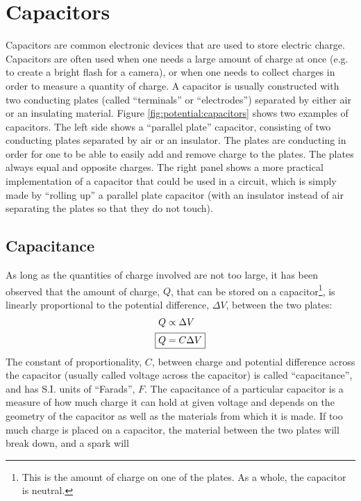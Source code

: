 \section{Capacitors}
Capacitors are common electronic devices that are used to store electric charge. Capacitors are often used when one needs a large amount of charge at once (e.g. to create a bright flash for a camera), or when one needs to collect charges in order to measure a quantity of charge. A capacitor is usually constructed with two conducting plates (called ``terminals'' or ``electrodes'') separated by either air or an insulating material.
Figure \ref{fig:potential:capacitors} shows two examples of capacitors. The left side shows a ``parallel plate'' capacitor, consisting of two conducting plates separated by air or an insulator. The plates are conducting in order for one to be able to easily add and remove charge to the plates. The plates always equal and opposite charges. The right panel shows a more practical implementation of a capacitor that could be used in a circuit, which is simply made by ``rolling up'' a parallel plate capacitor (with an insulator instead of air separating the plates so that they do not touch). 
\subsection{Capacitance}
As long as the quantities of charge involved are not too large, it has been observed that the amount of charge, $Q$, that can be stored on a capacitor\footnote{This is the amount of charge on one of the plates. As a whole, the capacitor is neutral.}, is linearly proportional to the potential difference, $\Delta V$, between the two plates:
\begin{align*}
Q&\propto \Delta V\\
\Aboxed{Q&=C\Delta V}\\
\end{align*}
The constant of proportionality, $C$, between charge and potential difference across the capacitor (usually called voltage across the capacitor) is called ``capacitance'', and has S.I. units of ``Farads'', $F$. The capacitance of a particular capacitor is a measure of how much charge it can hold at given voltage and depends on the geometry of the capacitor as well as the materials from which it is made. If too much charge is placed on a capacitor, the material between the two plates will break down, and a spark will 

